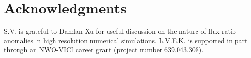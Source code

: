 \documentclass[useAMS,usenatbib]{mn2e}
\begin{document}

\section*{Acknowledgments}
S.V. is grateful to Dandan Xu for useful discussion on the nature of flux-ratio anomalies in high resolution numerical simulations.
L.V.E.K. is supported in part through an NWO-VICI career grant (project number 639.043.308).






\label{lastpage}
\end{document}
